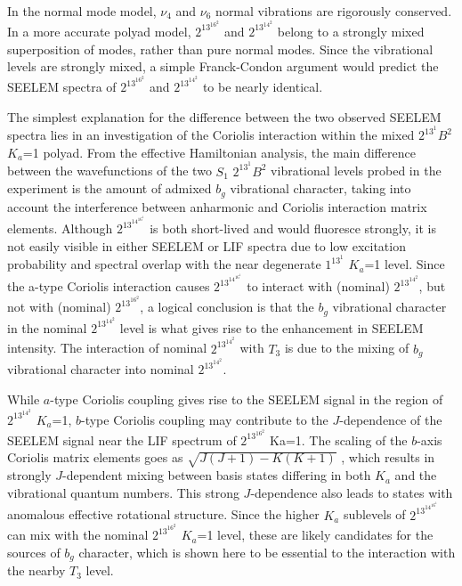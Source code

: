 \documentclass[12pt,draft]{mitthesis}
\begin{document}
In the normal mode model, $\nu_4$ and $\nu_6$ normal vibrations are
rigorously conserved. In a more accurate polyad model, $2^13^16^2$ and
$2^13^14^2$ belong to a strongly mixed superposition of modes, rather
than pure normal modes. Since the vibrational levels are strongly
mixed, a simple Franck-Condon argument would predict the SEELEM
spectra of $2^13^16^2$ and $2^13^14^2$ to be nearly identical.

The simplest explanation for the difference between the two observed
SEELEM spectra lies in an investigation of the Coriolis interaction
within the mixed $2^13^1B^2$ $K_a$=1 polyad. From the effective
Hamiltonian analysis, the main difference between the wavefunctions of
the two $S_1$ $2^13^1B^2$ vibrational levels probed in the experiment
is the amount of admixed $b_g$ vibrational character, taking into account
the interference between anharmonic and Coriolis interaction matrix
elements. Although $2^13^14^16^1$ is both short-lived and would
fluoresce strongly, it is not easily visible in either SEELEM or LIF
spectra due to low excitation probability and spectral overlap with
the near degenerate $1^13^1$ $K_a$=1 level. Since the a-type Coriolis
interaction causes $2^13^14^16^1$ to interact with (nominal)
$2^13^14^2$, but not with (nominal) $2^13^16^2$, a logical conclusion
is that the $b_g$ vibrational character in the nominal $2^13^14^2$ level
is what gives rise to the enhancement in SEELEM intensity. The
interaction of nominal $2^13^14^2$ with $T_3$ is due to the mixing of
$b_g$ vibrational character into nominal $2^13^14^2$.

While $a$-type Coriolis coupling gives rise to the SEELEM signal in the
region of $2^13^14^2$ $K_a$=1, $b$-type Coriolis coupling may
contribute to the $J$-dependence of the SEELEM signal near the LIF
spectrum of $2^13^16^2$ Ka=1.  The scaling of the $b$-axis Coriolis
matrix elements goes as $\sqrt{J(J+1)-K(K+1)}$ , which results in strongly
$J$-dependent mixing between basis states differing in both $K_a$ and
the vibrational quantum numbers. This strong $J$-dependence also leads
to states with anomalous effective rotational structure. Since the
higher $K_a$ sublevels of $2^13^14^16^1$ can mix with the nominal
$2^13^16^2$ $K_a$=1 level, these are likely candidates for the sources
of $b_g$ character, which is shown here to be essential to the
interaction with the nearby $T_3$ level.

\end{document}
